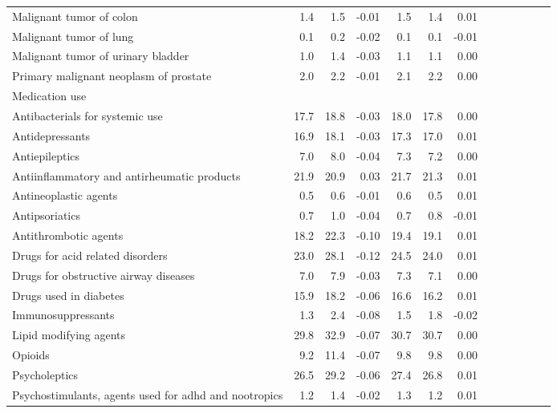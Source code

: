 \documentclass[11pt,]{article}
\begin{document}
\begin{longtable}{lrrrrrrrrrrrr}
      Malignant tumor of colon &  1.4 &  1.5 & -0.01 &  1.5 &  1.4 &  0.01 \\ 
      Malignant tumor of lung &  0.1 &  0.2 & -0.02 &  0.1 &  0.1 & -0.01 \\ 
      Malignant tumor of urinary bladder &  1.0 &  1.4 & -0.03 &  1.1 &  1.1 &  0.00 \\ 
      Primary malignant neoplasm of prostate &  2.0 &  2.2 & -0.01 &  2.1 &  2.2 &  0.00 \\ 
  Medication use &    &    &     &    &    &     \\ 
      Antibacterials for systemic use & 17.7 & 18.8 & -0.03 & 18.0 & 17.8 &  0.00 \\ 
      Antidepressants & 16.9 & 18.1 & -0.03 & 17.3 & 17.0 &  0.01 \\ 
      Antiepileptics &  7.0 &  8.0 & -0.04 &  7.3 &  7.2 &  0.00 \\ 
      Antiinflammatory and antirheumatic products & 21.9 & 20.9 &  0.03 & 21.7 & 21.3 &  0.01 \\ 
      Antineoplastic agents &  0.5 &  0.6 & -0.01 &  0.6 &  0.5 &  0.01 \\ 
      Antipsoriatics &  0.7 &  1.0 & -0.04 &  0.7 &  0.8 & -0.01 \\ 
      Antithrombotic agents & 18.2 & 22.3 & -0.10 & 19.4 & 19.1 &  0.01 \\ 
      Drugs for acid related disorders & 23.0 & 28.1 & -0.12 & 24.5 & 24.0 &  0.01 \\ 
      Drugs for obstructive airway diseases &  7.0 &  7.9 & -0.03 &  7.3 &  7.1 &  0.00 \\ 
      Drugs used in diabetes & 15.9 & 18.2 & -0.06 & 16.6 & 16.2 &  0.01 \\ 
      Immunosuppressants &  1.3 &  2.4 & -0.08 &  1.5 &  1.8 & -0.02 \\ 
      Lipid modifying agents & 29.8 & 32.9 & -0.07 & 30.7 & 30.7 &  0.00 \\ 
      Opioids &  9.2 & 11.4 & -0.07 &  9.8 &  9.8 &  0.00 \\ 
      Psycholeptics & 26.5 & 29.2 & -0.06 & 27.4 & 26.8 &  0.01 \\ 
      Psychostimulants, agents used for adhd and nootropics &  1.2 &  1.4 & -0.02 &  1.3 &  1.2 &  0.01 \\ 
   \bottomrule\end{longtable}
\clearpage
{}
\end{document}
